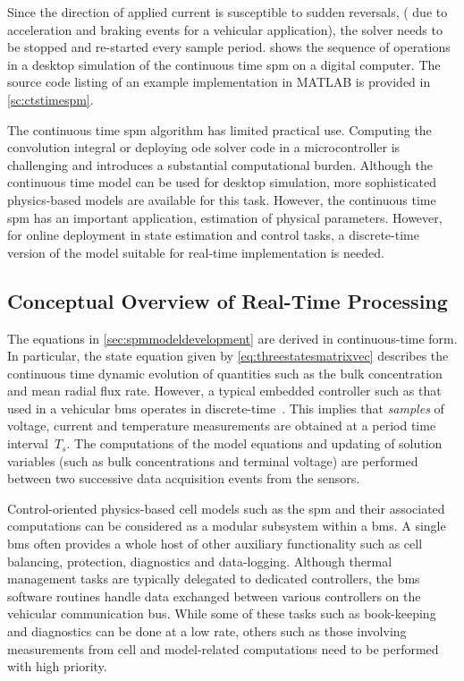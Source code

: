 Since  the direction  of applied  current  is susceptible  to sudden  reversals,
(\eg{}  due to  acceleration and  braking events  for a  vehicular application),
the  solver   needs  to   be  stopped  and   re-started  every   sample  period.
 shows the  sequence of operations in  a desktop simulation
of the continuous time \gls{spm} on  a digital computer. The source code listing
of an example implementation in \textsc{MATLAB} is provided in \cref{sc:ctstimespm}.
\vspace{3ex}


The continuous time \gls{spm} algorithm has limited practical use. Computing the
convolution integral  or deploying  \gls{ode} solver  code in  a microcontroller
is  challenging  and introduces  a  substantial  computational burden.  Although
the  continuous   time  model   can  be  used   for  desktop   simulation,  more
sophisticated physics-based  models are  available for  this task.  However, the
continuous time  \gls{spm} has  an important  application, \viz{}  estimation of
physical  parameters. However,  for online  deployment in  state estimation  and
control  tasks, a  discrete-time version  of  the model  suitable for  real-time
implementation is needed.


\subsection{Conceptual Overview of Real-Time Processing}

The equations  in \cref{sec:spmmodeldevelopment} are derived  in continuous-time
form. In particular, the  state equation given by \cref{eq:threestatesmatrixvec}
describes  the  continuous   time  dynamic  evolution  of   quantities  such  as
the  bulk  concentration   and  mean  radial  flux  rate.   However,  a  typical
embedded  controller  such  as  that  used in  a  vehicular  \gls{bms}  operates
in   discrete-time~\cite{Andrea2010}.  This   implies  that   \emph{samples}  of
voltage,  current and  temperature measurements  are obtained  at a  period time
interval~$T_s$. The computations of the model equations and updating of solution
variables  (such as  bulk  concentrations and  terminal  voltage) are  performed
between two successive data acquisition events from the sensors.


Control-oriented  physics-based cell  models  such as  the  \gls{spm} and  their
associated  computations can  be  considered  as a  modular  subsystem within  a
\gls{bms}. A  single \gls{bms} often  provides a  whole host of  other auxiliary
functionality such as cell  balancing, protection, diagnostics and data-logging.
Although  thermal   management  tasks  are  typically   delegated  to  dedicated
controllers,  the  \gls{bms} software  routines  handle  data exchanged  between
various  controllers on  the vehicular  communication bus.  While some  of these
tasks such  as book-keeping and  diagnostics can be done  at a low  rate, others
such as  those involving measurements  from cell and  model-related computations
need to be performed with high priority.

